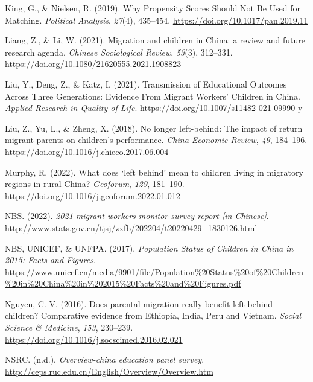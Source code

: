 \documentclass[
  man,floatsintext]{apa7}
\newlength{\cslhangindent}
\newlength{\cslentryspacingunit} %
\newenvironment{CSLReferences}[2] %
 {%
  \setlength{\parindent}{0pt}
  \ifodd #1
  \let\oldpar\par
  \def\par{\hangindent=\cslhangindent\oldpar}
  \fi
  \setlength{\parskip}{#2\cslentryspacingunit}
 }%
 {}
\begin{document}
\begin{CSLReferences}{1}{0}
\leavevmode{}%
King, G., \& Nielsen, R. (2019). Why Propensity Scores Should Not Be Used for Matching. \emph{Political Analysis}, \emph{27}(4), 435--454. \url{https://doi.org/10.1017/pan.2019.11}

\leavevmode{}%
Liang, Z., \& Li, W. (2021). Migration and children in China: a review and future research agenda. \emph{Chinese Sociological Review}, \emph{53}(3), 312--331. \url{https://doi.org/10.1080/21620555.2021.1908823}

\leavevmode{}%
Liu, Y., Deng, Z., \& Katz, I. (2021). Transmission of Educational Outcomes Across Three Generations: Evidence From Migrant Workers{'} Children in China. \emph{Applied Research in Quality of Life}. \url{https://doi.org/10.1007/s11482-021-09990-y}

\leavevmode{}%
Liu, Z., Yu, L., \& Zheng, X. (2018). No longer left-behind: The impact of return migrant parents on children's performance. \emph{China Economic Review}, \emph{49}, 184--196. \url{https://doi.org/10.1016/j.chieco.2017.06.004}

\leavevmode{}%
Murphy, R. (2022). What does {`}left behind{'} mean to children living in migratory regions in rural China? \emph{Geoforum}, \emph{129}, 181--190. \url{https://doi.org/10.1016/j.geoforum.2022.01.012}

\leavevmode{}%
NBS. (2022). \emph{2021 migrant workers monitor survey report {[}in Chinese{]}}. \url{http://www.stats.gov.cn/tjsj/zxfb/202204/t20220429_1830126.html}

\leavevmode{}%
NBS, UNICEF, \& UNFPA. (2017). \emph{Population Status of Children in China in 2015: Facts and Figures}. \url{https://www.unicef.cn/media/9901/file/Population\%20Status\%20of\%20Children\%20in\%20China\%20in\%202015\%20Facts\%20and\%20Figures.pdf}

\leavevmode{}%
Nguyen, C. V. (2016). Does parental migration really benefit left-behind children? Comparative evidence from Ethiopia, India, Peru and Vietnam. \emph{Social Science \& Medicine}, \emph{153}, 230--239. \url{https://doi.org/10.1016/j.socscimed.2016.02.021}

\leavevmode{}%
NSRC. (n.d.). \emph{Overview-china education panel survey}. \url{http://ceps.ruc.edu.cn/English/Overview/Overview.htm}


\end{CSLReferences}
\end{document}
